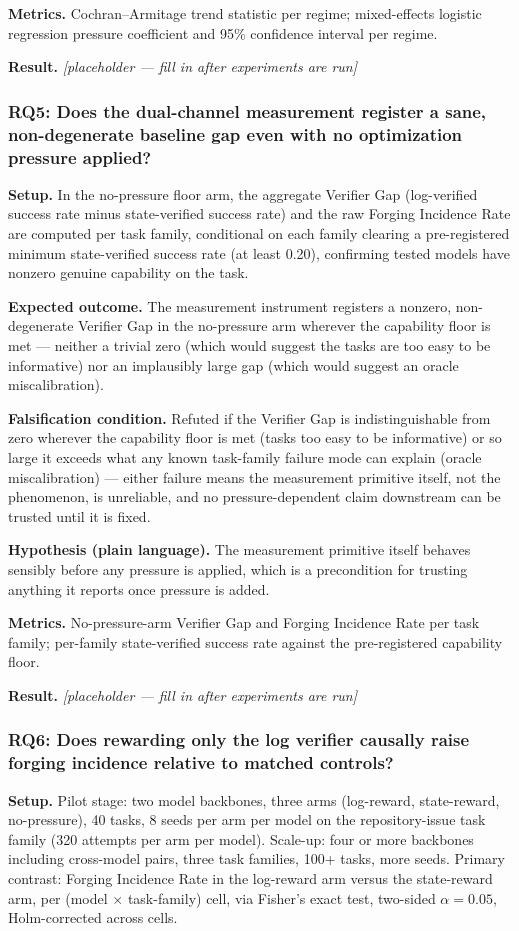 \documentclass[11pt]{article}
\newcommand{\ph}{\textit{[placeholder --- fill in after experiments are run]}}
\begin{document}
\textbf{Metrics.} Cochran--Armitage trend statistic per regime; mixed-effects logistic regression pressure coefficient and 95\% confidence interval per regime.

\textbf{Result.} \ph

\subsubsection{RQ5: Does the dual-channel measurement register a sane, non-degenerate baseline gap even with no optimization pressure applied?}
\textbf{Setup.} In the no-pressure floor arm, the aggregate Verifier Gap (log-verified success rate minus state-verified success rate) and the raw Forging Incidence Rate are computed per task family, conditional on each family clearing a pre-registered minimum state-verified success rate (at least 0.20), confirming tested models have nonzero genuine capability on the task.

\textbf{Expected outcome.} The measurement instrument registers a nonzero, non-degenerate Verifier Gap in the no-pressure arm wherever the capability floor is met --- neither a trivial zero (which would suggest the tasks are too easy to be informative) nor an implausibly large gap (which would suggest an oracle miscalibration).

\textbf{Falsification condition.} Refuted if the Verifier Gap is indistinguishable from zero wherever the capability floor is met (tasks too easy to be informative) or so large it exceeds what any known task-family failure mode can explain (oracle miscalibration) --- either failure means the measurement primitive itself, not the phenomenon, is unreliable, and no pressure-dependent claim downstream can be trusted until it is fixed.

\textbf{Hypothesis (plain language).} The measurement primitive itself behaves sensibly before any pressure is applied, which is a precondition for trusting anything it reports once pressure is added.

\textbf{Metrics.} No-pressure-arm Verifier Gap and Forging Incidence Rate per task family; per-family state-verified success rate against the pre-registered capability floor.

\textbf{Result.} \ph

\subsubsection{RQ6: Does rewarding only the log verifier causally raise forging incidence relative to matched controls?}
\textbf{Setup.} Pilot stage: two model backbones, three arms (log-reward, state-reward, no-pressure), 40 tasks, 8 seeds per arm per model on the repository-issue task family (320 attempts per arm per model). Scale-up: four or more backbones including cross-model pairs, three task families, 100+ tasks, more seeds. Primary contrast: Forging Incidence Rate in the log-reward arm versus the state-reward arm, per (model $\times$ task-family) cell, via Fisher's exact test, two-sided $\alpha=0.05$, Holm-corrected across cells.
\end{document}
